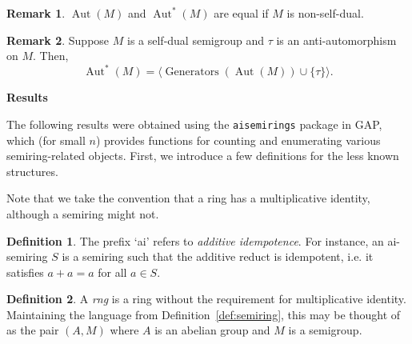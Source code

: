 \documentclass{article}
\theoremstyle{definition}
\newtheorem{definition}{Definition}
\newtheorem{remark}{Remark}
\begin{document}
\begin{remark}
    \(\operatorname{Aut}(M)\) and \(\operatorname{Aut}^*(M)\) are equal if \(M\) is non-self-dual.
\end{remark}

\begin{remark}
    Suppose \(M\) is a self-dual semigroup and \(\tau\) is an anti-automorphism on \(M\). Then, 
    \[\operatorname{Aut}^*(M) = \langle\operatorname{Generators}(\operatorname{Aut}(M)) \cup \{\tau\}\rangle.\]
\end{remark}
\vspace{3em}
\begin{center}
    \textbf{Results}
\end{center}
The following results were obtained using the \texttt{aisemirings} package in GAP, which (for small \(n\)) provides functions for counting and enumerating various semiring-related objects. First, we introduce a few definitions for the less known structures.

Note that we take the convention that a ring has a multiplicative identity, although a semiring might not.

\begin{definition}
    The prefix `ai' refers to \emph{additive idempotence}. For instance, an ai-semiring \(S\) is a semiring such that the additive reduct is idempotent, i.e. it satisfies \(a + a = a\) for all \(a\in S\).
\end{definition}
\begin{definition}
    A \emph{rng} is a ring without the requirement for multiplicative identity. Maintaining the language from Definition~\ref{def:semiring}, this may be thought of as the pair \((A, M)\) where \(A\) is an abelian group and \(M\) is a semigroup.
\end{definition}
\end{document}
